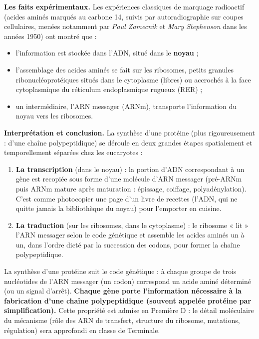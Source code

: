 \documentclass[11pt]{article}
\newcommand{\cle}[1]{{\popxbold\color{popdark}#1}}
\begin{document}
\textbf{Les faits expérimentaux.} Les expériences classiques de marquage radioactif (acides aminés marqués au carbone 14, suivis par autoradiographie sur coupes cellulaires, menées notamment par \emph{Paul Zamecnik} et \emph{Mary Stephenson} dans les années 1950) ont montré que :
\begin{itemize}
\item l'information est stockée dans l'\cle{ADN}, situé dans le \textbf{noyau} ;
\item l'assemblage des acides aminés se fait sur les \cle{ribosomes}, petits granules ribonucléoprotéiques situés dans le cytoplasme (libres) ou accrochés à la face cytoplasmique du \cle{réticulum endoplasmique rugueux} (RER) ;
\item un intermédiaire, l'\cle{ARN messager} (ARNm), transporte l'information du noyau vers les ribosomes.
\end{itemize}

\textbf{Interprétation et conclusion.} La synthèse d'une protéine (plus rigoureusement : d'une chaîne polypeptidique) se déroule en deux grandes étapes spatialement et temporellement séparées chez les eucaryotes :

\begin{enumerate}
\item \textbf{La transcription} (dans le noyau) : la portion d'ADN correspondant à un \cle{gène} est recopiée sous forme d'une molécule d'ARN messager (pré-ARNm puis ARNm mature après maturation : épissage, coiffage, polyadénylation). C'est comme photocopier une page d'un livre de recettes (l'ADN, qui ne quitte jamais la bibliothèque du noyau) pour l'emporter en cuisine.
\item \textbf{La traduction} (sur les ribosomes, dans le cytoplasme) : le ribosome « lit » l'ARN messager selon le code génétique et assemble les acides aminés un à un, dans l'ordre dicté par la succession des codons, pour former la chaîne polypeptidique.
\end{enumerate}

\begin{propriete}
La synthèse d'une protéine suit le \cle{code génétique} : à chaque groupe de trois nucléotides de l'ARN messager (un \cle{codon}) correspond un acide aminé déterminé (ou un signal d'arrêt). \textbf{Chaque gène porte l'information nécessaire à la fabrication d'une chaîne polypeptidique (souvent appelée protéine par simplification).} Cette propriété est admise en Première D : le détail moléculaire du mécanisme (rôle des ARN de transfert, structure du ribosome, mutations, régulation) sera approfondi en classe de Terminale.
\end{propriete}
\end{document}
